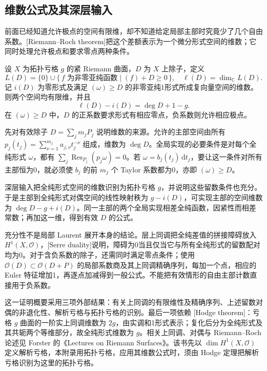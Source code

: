 \subsection{维数公式及其深层输入}
\label{b3:subsec:A0601}

前面已经知道允许极点的空间有限维，却不知道给定局部主部时究竟少了几个自由系数。[Riemann--Roch theorem]把这个差额表示为一个微分形式空间的维数；它同时处理允许极点和要求零点两种条件。

\begin{theorem}\label{b3:thm:A-riemann-roch}
设 \(X\) 为拓扑亏格 \(g\) 的紧 Riemann 曲面，\(D\) 为 \(X\) 上除子，定义
\[
 L(D)=\{0\}\cup\{\,f\text{ 为非零亚纯函数}\mid(f)+D\ge0\,\},
 \quad \ell(D)=\dim_{\mathbb C}L(D).
\]
记 \(i(D)\) 为零形式及满足 \((\omega)\ge D\) 的非零亚纯1形式所成复向量空间的维数。则两个空间均有限维，并且
\[
 \ell(D)-i(D)=\deg D+1-g.
\]
在 \((\omega)\ge D\) 中，\(D\) 的正系数要求形式有相应零点，负系数则允许相应极点。
\end{theorem}
\begin{proofsketch}
先对有效除子 \(D=\sum_j m_jP_j\) 说明维数的来源。允许的主部空间由所有 \(p_j(t_j)=\sum_{\nu=1}^{m_j}a_{j,\nu}t_j^{-\nu}\) 组成，维数为 \(\deg D\)。全局实现的必要条件是对每个全纯形式 \(\omega\)，都有 \(\sum_j\operatorname{Res}_{P_j}(p_j\omega)=0\)。若 \(\omega=b_j(t_j)\,\mathrm{d}t_j\)，要让这一条件对所有主部恒为0，就必须使 \(b_j\) 的前 \(m_j\) 个 Taylor 系数都为0，亦即 \((\omega)\ge D\)。

深层输入把全纯形式空间的维数识别为拓扑亏格 \(g\)，并说明这些留数条件也充分。于是主部到全纯形式对偶空间的线性映射秩为 \(g-i(D)\)，可实现主部的空间维数为 \(\deg D-g+i(D)\)。同一主部的两个全局实现相差全纯函数，因紧性而相差常数；再加这一维，得到有效 \(D\) 的公式。

充分性不是局部 Laurent 展开本身的结论。层上同调把全纯差值的拼接障碍放入 \(H^1(X,\mathcal O)\)，[Serre duality]说明，障碍为0当且仅当它与所有全纯形式的留数配对均为0。对于含负系数的除子，还需同时满足零点条件；使用 \(\mathcal O(D)\subset\mathcal O(D+P)\) 的局部系数商及其上同调精确序列，每加一个点，相应的 Euler 特征增加1，再逐点加减得到一般公式。不能把有效情形的自由主部计数直接用于负系数。

这一证明概要采用三项外部结果：有关上同调的有限维性及精确序列、上述留数对偶的非退化性、解析亏格与拓扑亏格的识别。最后一项依赖 [Hodge theorem]：亏格 \(g\) 曲面的一阶实上同调维数为 \(2g\)，由实调和1形式表示；复化后分为全纯形式及其共轭两个等维部分，故全纯形式维数为 \(g\)。相关上同调、对偶与 Riemann--Roch 论述见 Forster 的《Lectures on Riemann Surfaces》\cite[pp. 129--131, 135--139, 156--158]{Forster1981Lectures}。该书先以 \(\dim H^1(X,\mathcal O)\) 定义解析亏格，本附录用拓扑亏格，应用其维数公式时，须由 Hodge 定理把解析亏格识别为这里的拓扑亏格。
\end{proofsketch}

